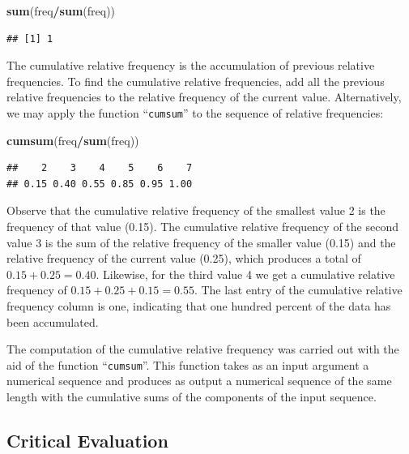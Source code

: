 \documentclass[]{krantz}
\makeatletter
\newenvironment{Shaded}{\begin{snugshade}}{\end{snugshade}}
\newcommand{\KeywordTok}[1]{\textcolor[rgb]{0.13,0.29,0.53}{\textbf{#1}}}
\newcommand{\NormalTok}[1]{#1}
\newcommand{\OperatorTok}[1]{\textcolor[rgb]{0.81,0.36,0.00}{\textbf{#1}}}
\newenvironment{kframe}{%
\medskip{}
\setlength{\fboxsep}{.8em}
 \def\at@end@of@kframe{}%
 \ifinner\ifhmode%
  \def\at@end@of@kframe{\end{minipage}}%
  \begin{minipage}{\columnwidth}%
 \fi\fi%
 \def\FrameCommand##1{\hskip\@totalleftmargin \hskip-\fboxsep
 \colorbox{shadecolor}{##1}\hskip-\fboxsep
     \hskip-\linewidth \hskip-\@totalleftmargin \hskip\columnwidth}%
 \MakeFramed {\advance\hsize-\width
   \@totalleftmargin\z@ \linewidth\hsize
   \@setminipage}}%
 {\par\unskip\endMakeFramed%
 \at@end@of@kframe}
\renewenvironment{Shaded}{\begin{kframe}}{\end{kframe}}
\theoremstyle{definition}
\theoremstyle{definition}
\theoremstyle{definition}
\theoremstyle{remark}
\makeatother
\begin{document}
\begin{Shaded}
\begin{Highlighting}[]
\KeywordTok{sum}\NormalTok{(freq}\OperatorTok{/}\KeywordTok{sum}\NormalTok{(freq))}
\end{Highlighting}
\end{Shaded}

\begin{verbatim}
## [1] 1
\end{verbatim}

The cumulative relative frequency is the accumulation of previous
relative frequencies. To find the cumulative relative frequencies, add
all the previous relative frequencies to the relative frequency of the
current value. Alternatively, we may apply the function ``\texttt{cumsum}'' to
the sequence of relative frequencies:

\begin{Shaded}
\begin{Highlighting}[]
\KeywordTok{cumsum}\NormalTok{(freq}\OperatorTok{/}\KeywordTok{sum}\NormalTok{(freq))}
\end{Highlighting}
\end{Shaded}

\begin{verbatim}
##    2    3    4    5    6    7 
## 0.15 0.40 0.55 0.85 0.95 1.00
\end{verbatim}

Observe that the cumulative relative frequency of the smallest value 2
is the frequency of that value (0.15). The cumulative relative frequency
of the second value 3 is the sum of the relative frequency of the
smaller value (0.15) and the relative frequency of the current value
(0.25), which produces a total of \(0.15 + 0.25 = 0.40\). Likewise, for
the third value 4 we get a cumulative relative frequency of
\(0.15 + 0.25 + 0.15 = 0.55\). The last entry of the cumulative relative
frequency column is one, indicating that one hundred percent of the data
has been accumulated.

The computation of the cumulative relative frequency was carried out
with the aid of the function ``\texttt{cumsum}''. This function takes as an input
argument a numerical sequence and produces as output a numerical
sequence of the same length with the cumulative sums of the components
of the input sequence.

\hypertarget{critical-evaluation}{%
\subsection{Critical Evaluation}\label{critical-evaluation}}
\end{document}
